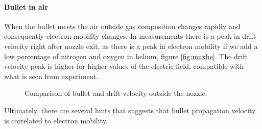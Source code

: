 \paragraph{Bullet in air}
When the bullet meets the air outside gas composition changes rapidly and consequently electron mobility changes. In measurements there is a peak in drift velocity right after nozzle exit, as there is a peak in electron mobility if we add a low percentage of nitrogen and oxygen in helium, figure \ref{fig:muxhe}. The drift velocity peak is higher for higher values of the electric field, compatible with what is seen from experiment.
\begin{figure}
 \hfill
 \caption{Comparison of bullet and drift velocity outside the nozzle.}
 \label{fig:muE}
\end{figure}



Ultimately, there are several hints that suggests that bullet propagation velocity is correlated to electron mobility.
